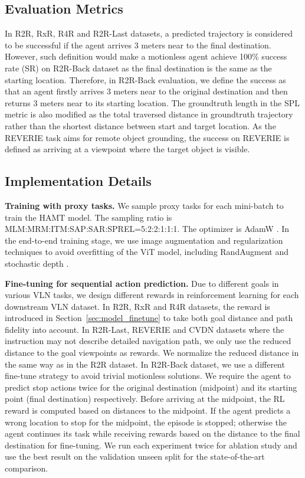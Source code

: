 \subsection{Evaluation Metrics}
In R2R, RxR, R4R and R2R-Last datasets, a predicted trajectory is considered to be successful if the agent arrives 3 meters near to the final destination.
However, such definition would make a motionless agent achieve 100\% success rate (SR) on R2R-Back dataset as the final destination is the same as the starting location.
Therefore, in R2R-Back evaluation, we define the success as that an agent firstly arrives 3 meters near to the original destination and then returns 3 meters near to its starting location.
The groundtruth length in the SPL metric is also modified as the total traversed distance in groundtruth trajectory rather than the shortest distance between start and target location. 
As the REVERIE task aims for remote object grounding, the success on REVERIE is defined as arriving at a viewpoint where the target object is visible.

\subsection{Implementation Details}

\noindent\textbf{Training with proxy tasks.}
We sample proxy tasks for each mini-batch to train the HAMT model. The sampling ratio is MLM:MRM:ITM:SAP:SAR:SPREL=5:2:2:1:1:1.
The optimizer is AdamW \cite{loshchilov2017decoupled}.
In the end-to-end training stage, we use image augmentation and regularization techniques to avoid overfitting of the ViT model, including RandAugment \cite{cubuk2020randaugment} and stochastic depth \cite{huang2016deep}.

\noindent\textbf{Fine-tuning for sequential action prediction.}
Due to different goals in various VLN tasks, we design different rewards in reinforcement learning for each downstream VLN dataset.
In R2R, RxR and R4R datasets, the reward is introduced in Section~\ref{sec:model_finetune} to take both goal distance and path fidelity into account.
In R2R-Last, REVERIE and CVDN datasets where the instruction may not describe detailed navigation path, we only use the reduced distance to the goal viewpoints as rewards. We normalize the reduced distance in the same way as in the R2R dataset.
In R2R-Back dataset, we use a different fine-tune strategy to avoid trivial motionless solutions.
We require the agent to predict stop actions twice for the original destination (midpoint) and its starting point (final destination) respectively.
Before arriving at the midpoint, the RL reward is computed based on distances to the midpoint.
If the agent predicts a wrong location to stop for the midpoint, the episode is stopped; otherwise the agent continues its task while receiving rewards based on the distance to the final destination for fine-tuning.
We run each experiment twice for ablation study and use the best result on the validation unseen split for the state-of-the-art comparison.

